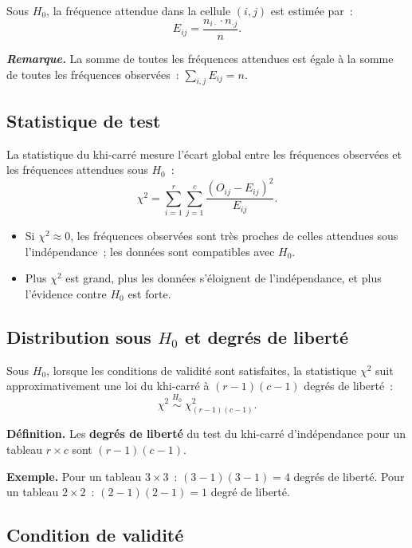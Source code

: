 \documentclass[11pt,french]{article}
\newcommand{\remarque}[1]{\medskip\noindent\textit{\textbf{Remarque.}} #1\medskip}
\begin{document}
Sous $H_0$, la fréquence attendue dans la cellule $(i,j)$ est estimée par~:
\[
  E_{ij} = \frac{n_{i\cdot} \cdot n_{\cdot j}}{n}.
\]

\remarque{La somme de toutes les fréquences attendues est égale à la somme de toutes les
fréquences observées~: $\sum_{i,j} E_{ij} = n$.}

\subsection{Statistique de test}

La statistique du khi-carré mesure l'écart global entre les fréquences observées et les
fréquences attendues sous $H_0$~:
\[
  \chi^2 = \sum_{i=1}^{r} \sum_{j=1}^{c} \frac{(O_{ij} - E_{ij})^2}{E_{ij}}.
\]

\begin{itemize}[itemsep=2pt]
  \item Si $\chi^2 \approx 0$, les fréquences observées sont très proches de celles attendues
        sous l'indépendance~; les données sont compatibles avec $H_0$.
  \item Plus $\chi^2$ est grand, plus les données s'éloignent de l'indépendance, et plus
        l'évidence contre $H_0$ est forte.
\end{itemize}

\subsection{Distribution sous $H_0$ et degrés de liberté}

Sous $H_0$, lorsque les conditions de validité sont satisfaites, la statistique $\chi^2$ suit
approximativement une loi du khi-carré à $(r-1)(c-1)$ degrés de liberté~:
\[
  \chi^2 \;\overset{H_0}{\sim}\; \chi^2_{(r-1)(c-1)}.
\]

\textbf{Définition.} Les \textbf{degrés de liberté} du test du khi-carré d'indépendance pour
un tableau $r \times c$ sont $(r-1)(c-1)$.

\textbf{Exemple.} Pour un tableau $3 \times 3$~: $(3-1)(3-1) = 4$ degrés de liberté.
Pour un tableau $2 \times 2$~: $(2-1)(2-1) = 1$ degré de liberté.

\subsection{Condition de validité}
\end{document}
